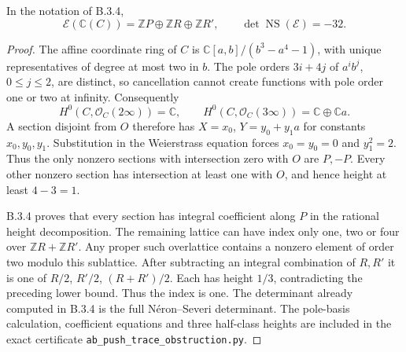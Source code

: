 \begin{corollary}\label{push:B35}
In the notation of B.3.4,
\[
 \mathscr E(\mathbb C(C))
   =\mathbb ZP\oplus\mathbb ZR\oplus\mathbb ZR',
 \qquad \det\operatorname{NS}(\mathscr E)=-32.
\]
\end{corollary}
\begin{proof}
The affine coordinate ring of $C$ is
$\mathbb C[a,b]/(b^3-a^4-1)$, with
unique representatives of degree at most
two in $b$. The pole orders $3i+4j$ of
$a^ib^j$, $0\le j\le2$, are distinct,
so cancellation cannot create functions
with pole order one or two at infinity.
Consequently
\[
 H^0(C,\mathcal O_C(2\infty))=\mathbb C,
 \qquad
 H^0(C,\mathcal O_C(3\infty))
       =\mathbb C\oplus\mathbb Ca.
\]
A section disjoint from $O$ therefore
has $X=x_0$, $Y=y_0+y_1a$ for constants
$x_0,y_0,y_1$. Substitution in the
Weierstrass equation forces $x_0=y_0=0$
and $y_1^2=2$. Thus the only nonzero
sections with intersection zero with
$O$ are $P,-P$.
Every other nonzero section has
intersection at least one with $O$,
and hence height at least $4-3=1$.

B.3.4 proves that every section has
integral coefficient along $P$ in the
rational height decomposition. The
remaining lattice can have index only
one, two or four over $\mathbb ZR+\mathbb ZR'$.
Any proper such overlattice contains a
nonzero element of order two modulo
this sublattice. After subtracting an
integral combination of $R,R'$ it is
one of $R/2$, $R'/2$, $(R+R')/2$.
Each has height $1/3$, contradicting
the preceding lower bound. Thus the
index is one. The determinant already
computed in B.3.4 is the full
N\'eron--Severi determinant.
The pole-basis calculation, coefficient
equations and three half-class heights
are included in the exact certificate
\texttt{ab\_push\_trace\_obstruction.py}.
\end{proof}

